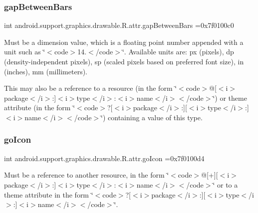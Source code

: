 \subsubsection{\texorpdfstring{gap\+Between\+Bars}{gapBetweenBars}}
{\footnotesize\ttfamily int android.\+support.\+graphics.\+drawable.\+R.\+attr.\+gap\+Between\+Bars =0x7f0100c0\hspace{0.3cm}{\ttfamily [static]}}

Must be a dimension value, which is a floating point number appended with a unit such as \char`\"{}$<$code$>$14.\+5sp$<$/code$>$\char`\"{}. Available units are\+: px (pixels), dp (density-\/independent pixels), sp (scaled pixels based on preferred font size), in (inches), mm (millimeters). 

This may also be a reference to a resource (in the form \char`\"{}$<$code$>$@\mbox{[}$<$i$>$package$<$/i$>$\+:\mbox{]}$<$i$>$type$<$/i$>$\+:$<$i$>$name$<$/i$>$$<$/code$>$\char`\"{}) or theme attribute (in the form \char`\"{}$<$code$>$?\mbox{[}$<$i$>$package$<$/i$>$\+:\mbox{]}\mbox{[}$<$i$>$type$<$/i$>$\+:\mbox{]}$<$i$>$name$<$/i$>$$<$/code$>$\char`\"{}) containing a value of this type. \mbox{\label{classandroid_1_1support_1_1graphics_1_1drawable_1_1R_1_1attr_a261d168454bebe98931642009996a2e5}} 
\subsubsection{\texorpdfstring{go\+Icon}{goIcon}}
{\footnotesize\ttfamily int android.\+support.\+graphics.\+drawable.\+R.\+attr.\+go\+Icon =0x7f0100d4\hspace{0.3cm}{\ttfamily [static]}}

Must be a reference to another resource, in the form \char`\"{}$<$code$>$@\mbox{[}+\mbox{]}\mbox{[}$<$i$>$package$<$/i$>$\+:\mbox{]}$<$i$>$type$<$/i$>$\+:$<$i$>$name$<$/i$>$$<$/code$>$\char`\"{} or to a theme attribute in the form \char`\"{}$<$code$>$?\mbox{[}$<$i$>$package$<$/i$>$\+:\mbox{]}\mbox{[}$<$i$>$type$<$/i$>$\+:\mbox{]}$<$i$>$name$<$/i$>$$<$/code$>$\char`\"{}. \mbox{\label{classandroid_1_1support_1_1graphics_1_1drawable_1_1R_1_1attr_acf33b1be6a8a1797b55f6f10c4f57d50}} 
